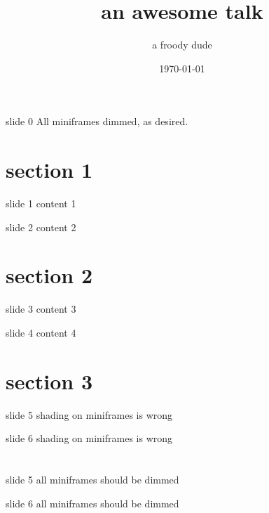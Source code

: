 \documentclass{beamer}
\title{an awesome talk}
\author{a froody dude}
\date{\today}
\makeatletter
\def\beamer@writeslidentry@miniframesoff{%
  \expandafter\beamer@ifempty\expandafter{\beamer@framestartpage}{}%
  {%
    \clearpage\beamer@notesactions%
  }
}
\newcommand*{\miniframesoff}{\let\beamer@writeslidentry=\beamer@writeslidentry@miniframesoff}
\makeatother
\begin{document}
\begin{frame}[plain]
\titlepage
\end{frame}

\begin{frame}{slide 0}
All miniframes dimmed, as desired.
\end{frame}

\section{section 1}

\begin{frame}{slide 1}
content 1
\end{frame}

\begin{frame}{slide 2}
content 2
\end{frame}

\section{section 2}

\begin{frame}{slide 3}
content 3
\end{frame}

\begin{frame}{slide 4}
content 4
\end{frame}

\section{section 3}

\begin{frame}{slide 5}
shading on miniframes is wrong
\end{frame}

\begin{frame}{slide 6}
shading on miniframes is wrong
\end{frame}

\section{}
\miniframesoff

\begin{frame}{slide 5}
all miniframes should be dimmed
\end{frame}

\begin{frame}{slide 6}
all miniframes should be dimmed
\end{frame}
\end{document}

